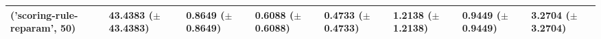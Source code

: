 \begin{tabular}{llllllll}
('scoring-rule-reparam', 50) & \makecell{43.4383 \\ ($\pm$ 43.4383)} & \makecell{0.8649 \\ ($\pm$ 0.8649)} & \makecell{0.6088 \\ ($\pm$ 0.6088)} & \makecell{0.4733 \\ ($\pm$ 0.4733)} & \makecell{1.2138 \\ ($\pm$ 1.2138)} & \makecell{0.9449 \\ ($\pm$ 0.9449)} & \makecell{3.2704 \\ ($\pm$ 3.2704)} \\
\bottomrule
\end{tabular}
